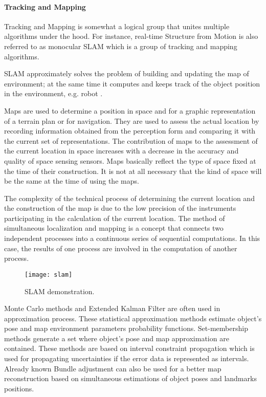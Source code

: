 \documentclass[../../../../main]{subfiles}
\begin{document}
\paragraph{Tracking and Mapping}

Tracking and Mapping is somewhat a logical group that unites multiple algorithms under the hood. For instance, real-time Structure from Motion is also referred to as monocular \ac{SLAM} which is a group of tracking and mapping algorithms.

\ac{SLAM} approximately solves the problem of building and updating the map of environment; at the same time it computes and keeps track of the object position in the environment, e.g. robot \cite{springer_handbook_of_robotics}. 

Maps are used to determine a position in space and for a graphic representation of a terrain plan or for navigation. They are used to assess the actual location by recording information obtained from the perception form and comparing it with the current set of representations. The contribution of maps to the assessment of the current location in space increases with a decrease in the accuracy and quality of space sensing sensors. Maps basically reflect the type of space fixed at the time of their construction. It is not at all necessary that the kind of space will be the same at the time of using the maps.

The complexity of the technical process of determining the current location and the construction of the map is due to the low precision of the instruments participating in the calculation of the current location. The method of simultaneous localization and mapping is a concept that connects two independent processes into a continuous series of sequential computations. In this case, the results of one process are involved in the computation of another process.

\begin{figure} [ht!]
    \begin{center}
        \texttt{[image: slam]}
        \caption{SLAM demonstration.}
        \label{fig:slam}
    \end{center}
\end{figure}

Monte Carlo methods and Extended Kalman Filter are often used in approximation process. These statistical approximation methods estimate object's pose and map environment parameters probability functions. Set-membership methods generate a set where object's pose and map approximation are contained. These methods are based on interval constraint propagation which is used for propagating uncertainties if the error data is represented as intervals. Already known Bundle adjustment can also be used for a better map reconstruction based on simultaneous estimations of object poses and landmarks positions.
\end{document}
